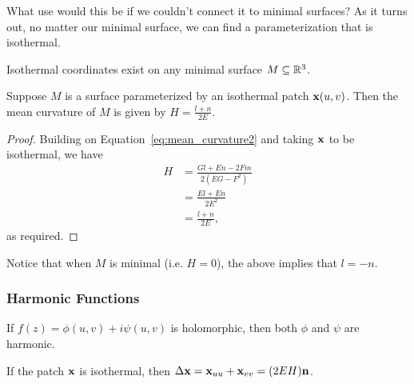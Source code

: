     What use would this be if we couldn't connect it to minimal surfaces? As it turns out, no matter our minimal surface, we can find a parameterization that is isothermal.

    \begin{thm}
      Isothermal coordinates exist on any minimal surface $M \subseteq \mathbb{R}^3$.
    \end{thm}

    \begin{lem}
      Suppose $M$ is a surface parameterized by an isothermal patch $\mathbf{x}(u, v)$. Then the mean curvature of $M$ is given by $H = \frac{l + n}{2E}$.
    \end{lem}
    \begin{proof}
      Building on Equation~\ref{eq:mean_curvature2} and taking $\mathbf{x}$ to be isothermal, we have
      \begin{align*}
        H &= \frac{Gl + En - 2Fm}{2(EG - F^2)}\\
        &= \frac{El + En}{2E^2}\\
        &= \frac{l + n}{2E},
      \end{align*}
      as required.
    \end{proof}

    \begin{unno_rem}
      Notice that when $M$ is minimal (i.e. $H = 0$), the above implies that $l = -n$.
    \end{unno_rem}

  \subsubsection{Harmonic Functions}


    \begin{thm}
      \label{thm:harmonic}
      If $f(z) = \phi(u, v) + i\psi(u, v)$ is holomorphic, then both $\phi$ and $\psi$ are harmonic.
    \end{thm}


    \begin{thm}
      \label{thm:deltaxehu}
      If the patch $\mathbf{x}$ is isothermal, then $\Delta\mathbf{x} = \mathbf{x}_{uu} + \mathbf{x}_{vv} = (2EH)\mathbf{n}$.
    \end{thm}
      
